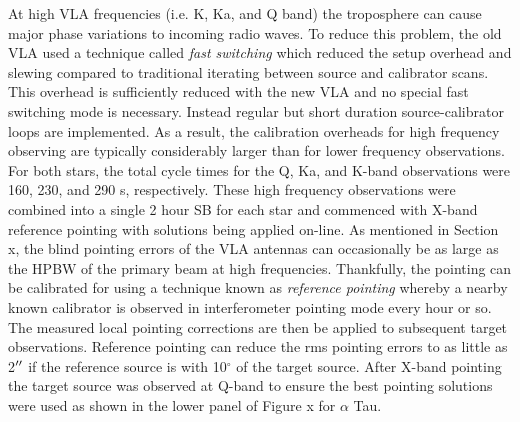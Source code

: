 At high VLA frequencies (i.e. K, Ka, and Q band) the troposphere can cause major phase variations to incoming radio waves. To reduce this problem, the old VLA used a technique called \textit{fast switching} which reduced the setup overhead and slewing compared to traditional iterating between source and calibrator scans. This overhead is sufficiently reduced with the new VLA and no special fast switching mode is necessary. Instead regular but short duration source-calibrator loops are implemented. As a result, the calibration overheads for high frequency observing are typically considerably larger than for lower frequency observations. For both stars, the total cycle times for the Q, Ka, and K-band observations were 160, 230, and 290 s, respectively. These high frequency observations were combined into a single 2 hour SB for each star and commenced with X-band reference pointing with solutions being applied on-line. As mentioned in Section x, the blind pointing errors of the VLA antennas can occasionally be as large as the HPBW of the primary beam at high frequencies. Thankfully, the pointing can be calibrated for using a technique known as \textit{reference pointing} whereby a nearby known calibrator is observed in interferometer pointing mode every hour or so. The measured local pointing corrections are then be applied to subsequent target observations. Reference pointing can reduce the rms pointing errors to as little as 2$^{\prime\prime}$ if the reference source is with 10$^\circ$ of the target source. After X-band pointing the target source was observed at Q-band to ensure the best pointing solutions were used as shown in the lower panel of Figure x for $\alpha$ Tau.  